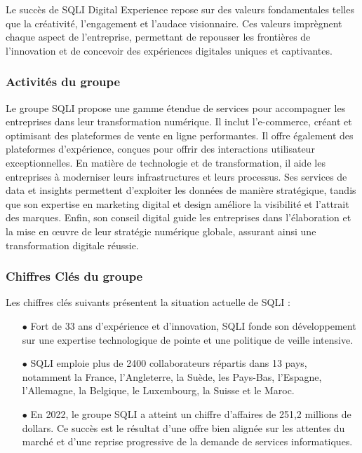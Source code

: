 Le succès de SQLI Digital Experience repose sur des valeurs fondamentales telles que la créativité, l'engagement et l'audace visionnaire. Ces valeurs imprègnent chaque aspect de l'entreprise, permettant de repousser les frontières de l'innovation et de concevoir des expériences digitales uniques et captivantes. \cite{valeurSQLI}

\subsubsection{Activités du groupe}

Le groupe SQLI propose une gamme étendue de services pour accompagner les entreprises dans leur transformation numérique. Il inclut l'e-commerce, créant et optimisant des plateformes de vente en ligne performantes. Il offre également des plateformes d'expérience, conçues pour offrir des interactions utilisateur exceptionnelles. En matière de technologie et de transformation, il aide les entreprises à moderniser leurs infrastructures et leurs processus. Ses services de data et insights permettent d'exploiter les données de manière stratégique, tandis que son expertise en marketing digital et design améliore la visibilité et l'attrait des marques. Enfin, son conseil digital guide les entreprises dans l'élaboration et la mise en œuvre de leur stratégie numérique globale, assurant ainsi une transformation digitale réussie. \cite{SQLI}

\subsubsection{Chiffres Clés du groupe}

Les chiffres clés suivants présentent la situation actuelle de SQLI :

\begin{itemize}
    \item[$\bullet$] Fort de 33 ans d’expérience et d’innovation, SQLI fonde son développement sur une expertise technologique de pointe et une politique de veille intensive.
    \item[$\bullet$] SQLI emploie plus de 2400 collaborateurs répartis dans 13 pays, notamment la France, l'Angleterre, la Suède, les Pays-Bas, l'Espagne, l'Allemagne, la Belgique, le Luxembourg, la Suisse et le Maroc.
    \item[$\bullet$] En 2022, le groupe SQLI a atteint un chiffre d’affaires de 251,2 millions de dollars. Ce succès est le résultat d'une offre bien alignée sur les attentes du marché et d'une reprise progressive de la demande de services informatiques.
    \vspace{0.5cm}
\end{itemize}

